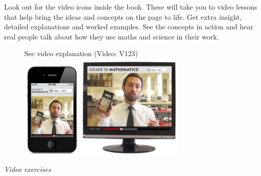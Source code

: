 {

Look out for the video icons inside the book. These will take you to video lessons  that help bring the ideas and concepts on the page to life. Get extra insight, detailed
explanations and worked examples. See the concepts in action and hear real people talk about how they
use maths and science in their work. \par

\begin{figure}[h]
\begin{center}
See video explanation  (Video: V123)\\
\includegraphics[width=0.25\textwidth]{title_images/Iphonevideo.png}
\hspace{1cm}
\includegraphics[width=0.45\textwidth]{title_images/PCscreenvideom.png}
\end{center}
\end{figure}

}
{\normalfont\sffamily\fontsize{22}\normalfont\itshape Video exercises} \par


